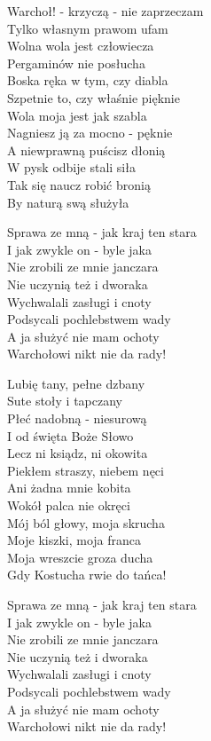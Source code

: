 \begin{text}
    \hfill\break
    Warchoł! - krzyczą - nie zaprzeczam\\
    Tylko własnym prawom ufam\\
    Wolna wola jest człowiecza\\
    Pergaminów nie posłucha\\
    Boska ręka w tym, czy diabla\\
    Szpetnie to, czy właśnie pięknie\\
    Wola moja jest jak szabla\\
    Nagniesz ją za mocno - pęknie\\
    A niewprawną puścisz dłonią\\
    W pysk odbije stali siła\\
    Tak się naucz robić bronią\\
    By naturą swą służyła

    \vin Sprawa ze mną - jak kraj ten stara\\
    \vin I jak zwykle on - byle jaka\\
    \vin Nie zrobili ze mnie janczara\\
    \vin Nie uczynią też i dworaka\\
    \vin Wychwalali zasługi i cnoty\\
    \vin Podsycali pochlebstwem wady\\
    \vin A ja służyć nie mam ochoty\\
    \vin Warchołowi nikt nie da rady!

    Lubię tany, pełne dzbany\\
    Sute stoły i tapczany\\
    Płeć nadobną - niesurową\\
    I od święta Boże Słowo\\
    Lecz ni ksiądz, ni okowita\\
    Piekłem straszy, niebem nęci\\
    Ani żadna mnie kobita\\
    Wokół palca nie okręci\\
    Mój ból głowy, moja skrucha\\
    Moje kiszki, moja franca\\
    Moja wreszcie groza ducha\\
    Gdy Kostucha rwie do tańca!

    \vin Sprawa ze mną - jak kraj ten stara\\
    \vin I jak zwykle on - byle jaka\\
    \vin Nie zrobili ze mnie janczara\\
    \vin Nie uczynią też i dworaka\\
    \vin Wychwalali zasługi i cnoty\\
    \vin Podsycali pochlebstwem wady\\
    \vin A ja służyć nie mam ochoty\\
    \vin Warchołowi nikt nie da rady!


\end{text}
